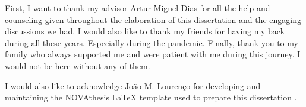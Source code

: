 
%

\begin{ntacknowledgements}

First, I want to thank my advisor Artur Miguel Dias for all the help and counseling
given throughout the elaboration of this dissertation and the engaging discussions we had.
I would also like to thank my friends for having my back during all these years. Especially during the pandemic.
Finally, thank you to my family who always supported me and were patient with me during this journey.
I would not be here without any of them.

I would also like to acknowledge Jo\~ao M. Louren\c{c}o for developing and maintaining the
NOVAthesis \LaTeX{} template used to prepare this dissertation \cite{novathesis-manual}.

\end{ntacknowledgements}
